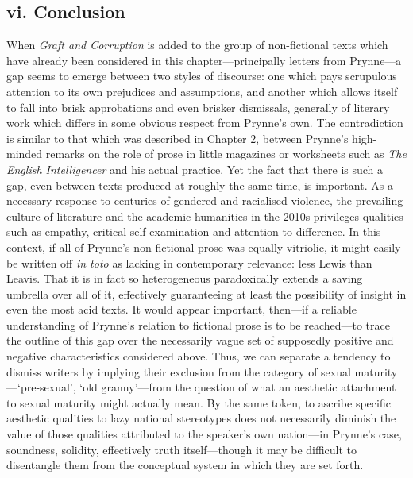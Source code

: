 \documentclass[]{article}
\begin{document}
\subsection{vi. Conclusion}\label{vi.-conclusion}

When \emph{Graft and Corruption} is added to the group of non-fictional
texts which have already been considered in this chapter---principally
letters from Prynne---a gap seems to emerge between two styles of
discourse: one which pays scrupulous attention to its own prejudices and
assumptions, and another which allows itself to fall into brisk
approbations and even brisker dismissals, generally of literary work
which differs in some obvious respect from Prynne's own. The
contradiction is similar to that which was described in Chapter 2,
between Prynne's high-minded remarks on the role of prose in little
magazines or worksheets such as \emph{The English Intelligencer} and his
actual practice. Yet the fact that there is such a gap, even between
texts produced at roughly the same time, is important. As a necessary
response to centuries of gendered and racialised violence, the
prevailing culture of literature and the academic humanities in the
2010s privileges qualities such as empathy, critical self-examination
and attention to difference. In this context, if all of Prynne's
non-fictional prose was equally vitriolic, it might easily be written
off \emph{in toto} as lacking in contemporary relevance: less Lewis than
Leavis. That it is in fact so heterogeneous paradoxically extends a
saving umbrella over all of it, effectively guaranteeing at least the
possibility of insight in even the most acid texts. It would appear
important, then---if a reliable understanding of Prynne's relation to
fictional prose is to be reached---to trace the outline of this gap over
the necessarily vague set of supposedly positive and negative
characteristics considered above. Thus, we can separate a tendency to
dismiss writers by implying their exclusion from the category of sexual
maturity---`pre-sexual', `old granny'---from the question of what an
aesthetic attachment to sexual maturity might actually mean. By the same
token, to ascribe specific aesthetic qualities to lazy national
stereotypes does not necessarily diminish the value of those qualities
attributed to the speaker's own nation---in Prynne's case, soundness,
solidity, effectively truth itself---though it may be difficult to
disentangle them from the conceptual system in which they are set forth.
\end{document}
